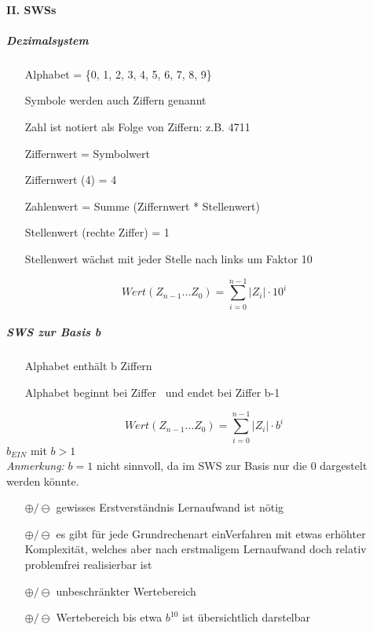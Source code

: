 \documentclass[10pt,a4paper]{scrartcl}
\begin{document}
	\paragraph{II. \acp{SWS}}
	\subparagraph{Dezimalsystem}
	\begin{itemize}
		\item[] Alphabet = \{0, 1, 2, 3, 4, 5, 6, 7, 8, 9\}
		\item[] Symbole werden auch Ziffern genannt
		\item[] Zahl ist notiert als Folge von Ziffern: z.B. 4711
		\item[] Ziffernwert = Symbolwert
		\item[] Ziffernwert (4) = 4
		\item[] Zahlenwert = Summe (Ziffernwert * Stellenwert) 
		\item[] Stellenwert (rechte Ziffer) = 1  
		\item[]Stellenwert wächst mit jeder Stelle nach links um Faktor 10
	\end{itemize}
	$$
	Wert(Z_{n-1} \dots Z_0) = \sum_{i=0}^{n-1}|Z_i|\cdot10^i
	$$
	\subparagraph{\ac{SWS} zur Basis b}
	\begin{itemize}
		\item[] Alphabet enthält b Ziffern
		\item[] Alphabet beginnt bei Ziffer \grqq\ und endet bei Ziffer \glqq b-1\grqq\
	\end{itemize} 
	$$
		Wert(Z_{n-1} \dots Z_0) = \sum_{i=0}^{n-1}|Z_i| \cdot b^i
	$$
	$b_{EIN}$ mit $b>1$\\
	\textit{Anmerkung:} $b=1$ nicht sinnvoll, da im \ac{SWS} zur Basis nur die 0 dargestelt werden könnte.
	\begin{itemize}
		\item[$ \oplus/\ominus $] gewisses \glqq Erstverständnis \grqq\/Lernaufwand ist nötig
		\item[$ \oplus/\ominus $] es gibt für jede Grundrechenart einVerfahren mit etwas erhöhter Komplexität, welches aber nach erstmaligem Lernaufwand doch relativ problemfrei realisierbar ist
		\item[$ \oplus/\ominus $] unbeschränkter Wertebereich
		\item[$ \oplus/\ominus $] Wertebereich bis etwa $b^10$ ist übersichtlich darstelbar
	\end{itemize}
\end{document}
